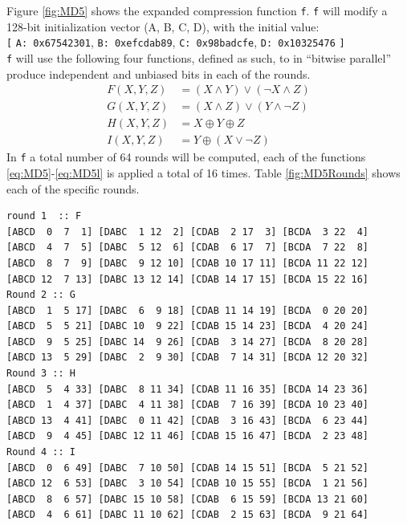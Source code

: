 \documentclass[a4paper, openany]{book}
\begin{document}
Figure \ref{fig:MD5} shows the expanded compression function \texttt{f}. \texttt{f} will modify a 128-bit initialization vector (A, B, C, D), with the initial value:\\
\texttt{[} \texttt{A: 0x67542301}, \texttt{B: 0xefcdab89}, \texttt{C: 0x98badcfe}, \texttt{D: 0x10325476} \texttt{]}\\
\texttt{f} will use the following four functions, defined as such, to in ``bitwise parallel'' produce independent and unbiased bits in each of the rounds.
\begin{align}\label{eq:MD5}
F(X, Y, Z) &= (X \wedge Y) \vee (\neg X \wedge Z) \\
G(X, Y, Z) &= (X \wedge Z) \vee (Y \wedge \neg Z) \\
H(X, Y, Z) &= X \oplus Y \oplus Z \\
I(X, Y, Z) &= Y \oplus ( X \vee \neg Z)\label{eq:MD5l}
\end{align}
In \texttt{f} a total number of 64 rounds will be computed, each of the functions \ref{eq:MD5}-\ref{eq:MD5l} is applied a total of 16 times. Table \ref{fig:MD5Rounds} shows each of the specific rounds.
\begin{table}[H]
\centering
\captionsetup{width=.8\linewidth}
\begin{BVerbatim}[fontsize=\tiny]
round 1  :: F
[ABCD  0  7  1] [DABC  1 12  2] [CDAB  2 17  3] [BCDA  3 22  4]
[ABCD  4  7  5] [DABC  5 12  6] [CDAB  6 17  7] [BCDA  7 22  8]
[ABCD  8  7  9] [DABC  9 12 10] [CDAB 10 17 11] [BCDA 11 22 12]
[ABCD 12  7 13] [DABC 13 12 14] [CDAB 14 17 15] [BCDA 15 22 16]
Round 2 :: G
[ABCD  1  5 17] [DABC  6  9 18] [CDAB 11 14 19] [BCDA  0 20 20]
[ABCD  5  5 21] [DABC 10  9 22] [CDAB 15 14 23] [BCDA  4 20 24]
[ABCD  9  5 25] [DABC 14  9 26] [CDAB  3 14 27] [BCDA  8 20 28]
[ABCD 13  5 29] [DABC  2  9 30] [CDAB  7 14 31] [BCDA 12 20 32]
Round 3 :: H
[ABCD  5  4 33] [DABC  8 11 34] [CDAB 11 16 35] [BCDA 14 23 36]
[ABCD  1  4 37] [DABC  4 11 38] [CDAB  7 16 39] [BCDA 10 23 40]
[ABCD 13  4 41] [DABC  0 11 42] [CDAB  3 16 43] [BCDA  6 23 44]
[ABCD  9  4 45] [DABC 12 11 46] [CDAB 15 16 47] [BCDA  2 23 48]
Round 4 :: I
[ABCD  0  6 49] [DABC  7 10 50] [CDAB 14 15 51] [BCDA  5 21 52]
[ABCD 12  6 53] [DABC  3 10 54] [CDAB 10 15 55] [BCDA  1 21 56]
[ABCD  8  6 57] [DABC 15 10 58] [CDAB  6 15 59] [BCDA 13 21 60]
[ABCD  4  6 61] [DABC 11 10 62] [CDAB  2 15 63] [BCDA  9 21 64]
\end{BVerbatim}
\caption[All rounds of a single MD5 iteration]%
{All rounds of a single MD5 iteration, where ~[abcd k s i]~\\
denotes \(a = b + (( a + round(b,c,d) + M[k] + K[i]) \lll s)\), and ~round~ denotes the function corresponding to one of the 4 functions corresponding to that round, ~M~ denotes the current 16-word buffer of the padded message and ~K[i]~ denotes \(floor(2^{32} \cdot |sin(i + 1)|)\).
}
\label{fig:MD5Rounds}
\end{table}
\end{document}
